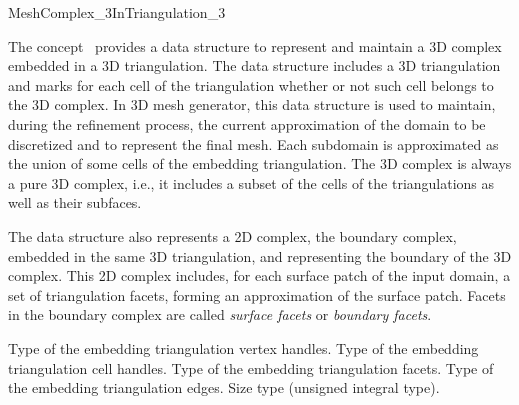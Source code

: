 \ccRefPageBegin


\begin{ccRefConcept}{MeshComplex_3InTriangulation_3}


\ccDefinition

The concept \ccRefName\ provides a data structure 
to represent and maintain a 3D complex embedded in a 3D triangulation.
The data structure includes a 3D triangulation and marks for each cell
of the triangulation whether or not such cell belongs to the 3D complex.
In \cgal{} 3D mesh generator, this data structure is used to maintain,
during the refinement process, the current  approximation
of the domain to be discretized and to represent the final mesh.
Each subdomain is approximated as the union of some
 cells of the embedding triangulation.
The 3D complex is always a pure 3D complex, i.e., it includes
a subset of the cells of the triangulations as well as their subfaces.

The data structure also represents a 2D complex, the boundary complex,
embedded in the same 3D
triangulation,  and  representing the boundary of the 3D complex.
 This 2D complex includes, for each surface patch of the input domain,
 a set of triangulation  facets, forming an approximation of the surface patch.
Facets in the boundary complex are called {\em surface facets} or
{\em boundary facets}.


\ccTypes

\ccGlue
{}
{ Type of
the embedding triangulation vertex handles.}
\ccGlue
{}
{ Type of
the embedding triangulation cell handles.}
\ccGlue
{}
{Type of
the embedding triangulation facets.}
\ccGlue
{}
{Type of
the embedding triangulation edges.}
\ccGlue
{}
{Size type (unsigned integral type).}


\end{ccRefConcept}
